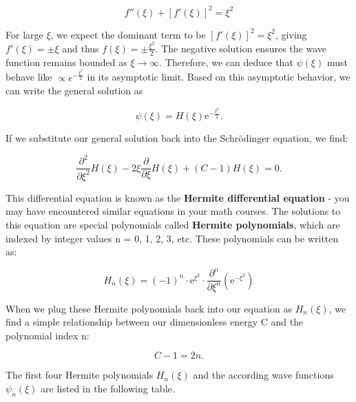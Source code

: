 \documentclass[
  a4paper,
]{book}
\begin{document}
\[f''(\xi) + [f'(\xi)]^2 = \xi^2\]

For large \(\xi\), we expect the dominant term to be
\([f'(\xi)]^2 = \xi^2\), giving \(f'(\xi) = \pm \xi\) and thus
\(f(\xi) = \pm \frac{\xi^2}{2}\). The negative solution ensures the wave
function remains bounded as \(\xi \to \infty\). Therefore, we can deduce
that \(\psi(\xi)\) must behave like \(\propto e^{-\frac{\xi^2}{2}}\) in
its asymptotic limit. Based on this asymptotic behavior, we can write
the general solution as

\[
\psi \left( \xi \right) = H \left( \xi \right) \mathrm{e}^{- \frac{\xi^2}{2}} \mathrm{.}
\]

If we substitute our general solution back into the Schrödinger
equation, we find:

\[
\frac{\partial^2}{\partial \xi^2} H \left( \xi \right) - 2 \xi \frac{\partial}{\partial \xi} H \left( \xi \right) + \left( C - 1 \right) H \left( \xi \right)  = 0 \mathrm{.}
\]

This differential equation is known as the \textbf{Hermite differential
equation} - you may have encountered similar equations in your math
courses. The solutions to this equation are special polynomials called
\textbf{Hermite polynomials}, which are indexed by integer values n = 0,
1, 2, 3, etc. These polynomials can be written as:

\[
H_n \left( \xi \right) = \left( -1 \right)^{n} \cdot \mathrm{e}^{\xi^2} \cdot \frac{\partial^{n}}{\partial \xi^{n}} \left( \mathrm{e}^{- \xi^2} \right)
\]

When we plug these Hermite polynomials back into our equation as
\(H_{n} \left( \xi \right)\), we find a simple relationship between our
dimensionless energy C and the polynomial index n:

\[
C -1 = 2 n \mathrm{.}
\]

The first four Hermite polynomials \(H_n \left( \xi \right)\) and the
according wave functions \(\psi_n \left( \xi \right)\) are listed in the
following table.
\end{document}
